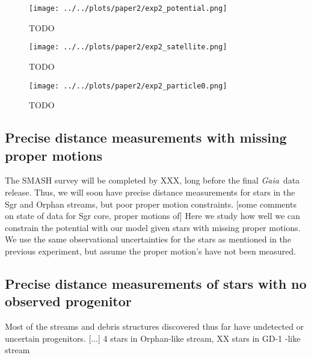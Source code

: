 \documentclass[letterpaper,12pt,preprint]{aastex}
\newcommand{\project}[1]{\textsl{#1}}
\newcommand{\gaia}{\project{Gaia}}
\begin{document}
\begin{figure}[!ht]
\begin{center}
\texttt{[image: ../../plots/paper2/exp2\_potential.png]}
\caption{ TODO  }\label{fig:exp2_potential}
\end{center}
\end{figure}

\begin{figure}[!ht]
\begin{center}
\texttt{[image: ../../plots/paper2/exp2\_satellite.png]}
\caption{ TODO  }\label{fig:exp2_satellite}
\end{center}
\end{figure}

\begin{figure}[!ht]
\begin{center}
\texttt{[image: ../../plots/paper2/exp2\_particle0.png]}
\caption{ TODO  }\label{fig:exp2_particle0}
\end{center}
\end{figure}

\subsection{Precise distance measurements with missing proper motions}
The SMASH survey \citep{smashprop} will be completed by XXX, long before the final \gaia\, data release. Thus, we will soon have precise distance measurements for stars in the Sgr and Orphan streams, but poor proper motion constraints. [some comments on state of data for Sgr core, proper motions of] Here we study how well we can constrain the potential with our model given stars with missing proper motions. We use the same observational uncertainties for the stars as mentioned in the previous experiment, but assume the proper motion's have not been measured. 

\subsection{Precise distance measurements of stars with no observed progenitor}
Most of the streams and debris structures discovered thus far have undetected or uncertain progenitors. [...]
4 stars in Orphan-like stream, XX stars in GD-1 -like stream

\end{document}
